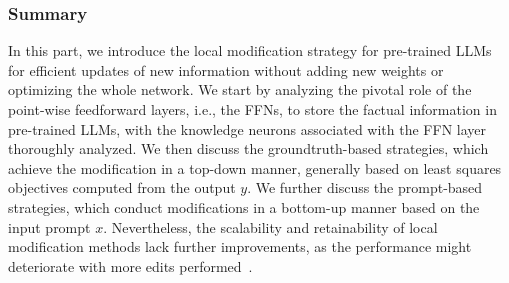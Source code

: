 \documentclass[acmsmall, screen]{acmart}
\begin{document}
\subsubsection{\textbf{Summary}}

In this part, we introduce the local modification strategy for pre-trained LLMs for efficient updates of new information without adding new weights or optimizing the whole network. We start by analyzing the pivotal role of the point-wise feedforward layers, i.e., the FFNs, to store the factual information in pre-trained LLMs, with the knowledge neurons associated with the FFN layer thoroughly analyzed. {We then discuss the groundtruth-based strategies, which achieve the modification in a top-down manner, generally based on least squares objectives computed from the output $y$. We further discuss the prompt-based strategies, which conduct modifications in a bottom-up manner based on the input prompt $x$}. Nevertheless, the scalability and retainability of local modification methods lack further improvements, as the performance might deteriorate with more edits performed~\cite{meng2023mass}.







%
%
\end{document}
